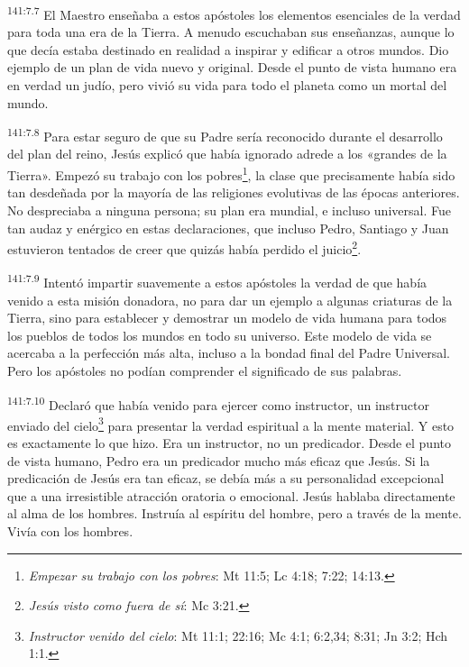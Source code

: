 \par 
\textsuperscript{141:7.7} El Maestro enseñaba a estos apóstoles los elementos esenciales de la verdad para toda una era de la Tierra. A menudo escuchaban sus enseñanzas, aunque lo que decía estaba destinado en realidad a inspirar y edificar a otros mundos. Dio ejemplo de un plan de vida nuevo y original. Desde el punto de vista humano era en verdad un judío, pero vivió su vida para todo el planeta como un mortal del mundo.

\par 
\textsuperscript{141:7.8} Para estar seguro de que su Padre sería reconocido durante el desarrollo del plan del reino, Jesús explicó que había ignorado adrede a los «grandes de la Tierra». Empezó su trabajo con los pobres\footnote{\textit{Empezar su trabajo con los pobres}: Mt 11:5; Lc 4:18; 7:22; 14:13.}, la clase que precisamente había sido tan desdeñada por la mayoría de las religiones evolutivas de las épocas anteriores. No despreciaba a ninguna persona; su plan era mundial, e incluso universal. Fue tan audaz y enérgico en estas declaraciones, que incluso Pedro, Santiago y Juan estuvieron tentados de creer que quizás había perdido el juicio\footnote{\textit{Jesús visto como fuera de sí}: Mc 3:21.}.

\par 
\textsuperscript{141:7.9} Intentó impartir suavemente a estos apóstoles la verdad de que había venido a esta misión donadora, no para dar un ejemplo a algunas criaturas de la Tierra, sino para establecer y demostrar un modelo de vida humana para todos los pueblos de todos los mundos en todo su universo. Este modelo de vida se acercaba a la perfección más alta, incluso a la bondad final del Padre Universal. Pero los apóstoles no podían comprender el significado de sus palabras.

\par 
\textsuperscript{141:7.10} Declaró que había venido para ejercer como instructor, un instructor enviado del cielo\footnote{\textit{Instructor venido del cielo}: Mt 11:1; 22:16; Mc 4:1; 6:2,34; 8:31; Jn 3:2; Hch 1:1.} para presentar la verdad espiritual a la mente material. Y esto es exactamente lo que hizo. Era un instructor, no un predicador. Desde el punto de vista humano, Pedro era un predicador mucho más eficaz que Jesús. Si la predicación de Jesús era tan eficaz, se debía más a su personalidad excepcional que a una irresistible atracción oratoria o emocional. Jesús hablaba directamente al alma de los hombres. Instruía al espíritu del hombre, pero a través de la mente. Vivía con los hombres.

